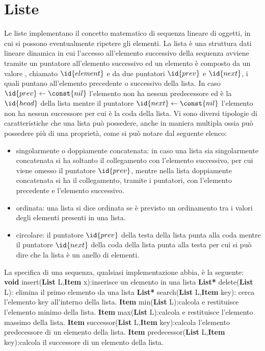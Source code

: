 \section{Liste}
Le liste implementano il concetto matematico di sequenza lineare di oggetti,
in cui si possono eventualmente ripetere gli elementi.\newline
La lista è una struttura dati lineare dinamica in cui l'accesso all'elemento successivo
della sequenza avviene tramite un puntatore all'elemento successivo ed un elemento
è composto da un valore , chiamato $\id{element}$ e da due puntatori $\id{prev}$ e $\id{next}$,
i quali puntano all'elemento precedente o successivo della lista.\newline
In caso $\id{prev} \gets \const{nil}$ l'elemento non ha nessun predecessore ed è la $\id{head}$
della lista mentre il puntatore $\id{next} \gets \const{nil}$ l'elemento non ha
nessun successore per cui è la coda della lista.
Vi sono diversi tipologie di caratteristiche che una lista può possedere, anche in
maniera multipla ossia può possedere più di una proprietà, come si può notare dal seguente elenco:
\begin{itemize}
  \item singolarmente o doppiamente concatenata: in caso una lista sia singolarmente
        concatenata si ha soltanto il collegamento con l'elemento successivo, per
        cui viene omesso il puntatore $\id{prev}$, mentre nella lista doppiamente concatenata
         si ha il collegamento, tramite i puntatori, con l'elemento precedente e l'elemento successivo.
  \item ordinata: una lista si dice ordinata se è previsto un ordinamento tra i valori
        degli elementi presenti in una lista.
  \item circolare: il puntatore $\id{prev}$ della testa della lista punta alla coda
        mentre il puntatore $\id{next}$ della coda della lista punta alla testa
       per cui si può dire che la lista è un anello di elementi.
\end{itemize}

La specifica di una sequenza, qualsiasi implementazione abbia, è la seguente:
\textbf{void} insert(\textbf{List} L,\textbf{Item} x):inserisce un elemento in una lista \newline
\textbf{List*} delete(\textbf{List} L): elimina il primo elemento da una lista \newline
\textbf{List*} search(\textbf{List} L,\textbf{Item} key): cerca l'elemento key all'interno della lista.\newline
\textbf{Item} min(\textbf{List} L):calcola e restituisce l'elemento minimo della lista.\newline
\textbf{Item} max(\textbf{List} L):calcola e restituisce l'elemento massimo della lista.\newline
\textbf{Item} successor(\textbf{List} L,\textbf{Item} key):calcola l'elemento predecessore di un elemento della lista.\newline
\textbf{Item} predecessor(\textbf{List} L,\textbf{Item} key):calcola il successore di un elemento della lista.\newline

